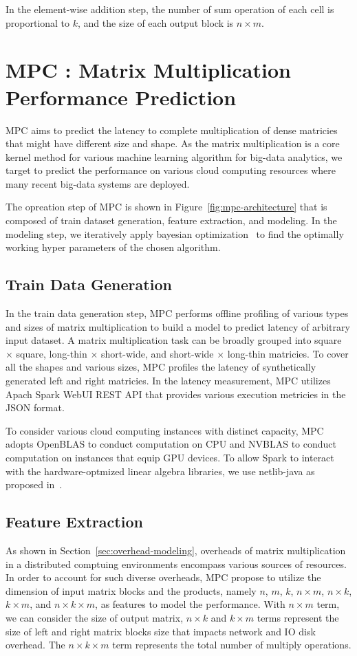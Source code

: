 \documentclass[10pt, conference, compsocconf]{IEEEtran}
\begin{document}
In the element-wise addition step, the number of sum operation of each cell is proportional to $k$, and the size of each output block is $n \times m$.

\section{MPC : Matrix Multiplication Performance Prediction}
MPC aims to predict the latency to complete multiplication of dense matricies that might have different size and shape. As the matrix multiplication is a core kernel method for various machine learning algorithm for big-data analytics, we target to predict the performance on various cloud computing resources where many recent big-data systems are deployed.


The opreation step of MPC is shown in Figure~\ref{fig:mpc-architecture} that is composed of train dataset generation, feature extraction, and modeling. In the modeling step, we iteratively apply bayesian optimization~\cite{bayesian-optimization} to find the optimally working hyper parameters of the chosen algorithm.

\subsection{Train Data Generation}
In the train data generation step, MPC performs offline profiling of various types and sizes of matrix multiplication to build a model to predict latency of arbitrary input dataset. A matrix multiplication task can be broadly grouped into square $\times$ square, long-thin $\times$ short-wide, and short-wide $\times$ long-thin matricies. To cover all the shapes and various sizes, MPC profiles the latency of synthetically generated left and right matricies. In the latency measurement, MPC utilizes Apach Spark WebUI REST API that provides various execution metricies in the JSON format.

To consider various cloud computing instances with distinct capacity, MPC adopts OpenBLAS to conduct computation on CPU and NVBLAS to conduct computation on instances that equip GPU devices. To allow Spark to interact with the hardware-optmized linear algebra libraries, we use netlib-java as proposed in~\cite{fatman-littleboy}.

\subsection{Feature Extraction}
As shown in Section~\ref{sec:overhead-modeling}, overheads of matrix multiplication in a distributed comptuing environments encompass various sources of resources. In order to account for such diverse overheads, MPC propose to utilize the dimension of input matrix blocks and the products, namely $n$, $m$, $k$, $n \times m$, $n \times k$, $k \times m$, and $n \times k \times m$, as features to model the performance. With $n \times m$ term, we can consider the size of output matrix, $n \times k$ and $k \times m$ terms represent the size of left and right matrix blocks size that impacts network and IO disk overhead. The $n \times k \times m$ term represents the total number of multiply operations.
\end{document}
